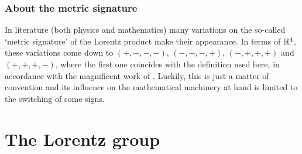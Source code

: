 \subsubsection{About the metric signature}
In literature (both physics and mathematics) many variations on the so-called `metric signature' of the Lorentz product make their appearance. In terms of \(\mathbb{R}^4\), these variations come down to \((+,-,-,-)\), \((-,-,-,+)\), \((-,+,+,+)\) and \((+,+,+,-)\), where the first one coincides with the definition used here, in accordance with the magnificent work of \citet{Landau1971}. Luckily, this is just a matter of convention and its influence on the mathematical machinery at hand is limited to the switching of some signs.

\section{The Lorentz group}

